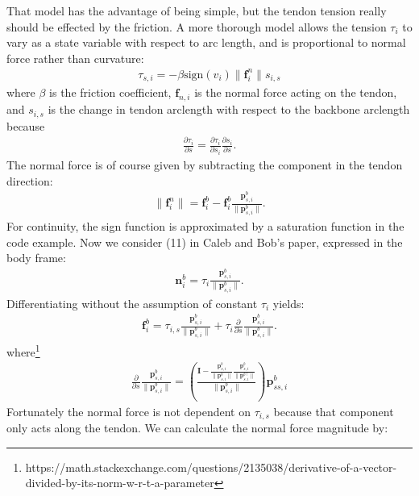 \documentclass[12pt]{article}
\begin{document}
That model has the advantage of being simple, but the tendon tension really should be effected by the friction. A more thorough model allows the tension $\tau_i$ to vary as a state variable with respect to arc length, and is proportional to normal force rather than curvature:
\begin{align*}
\tau_{s,i} = -\beta \text{sign}(v_{i}) \| \boldsymbol{f}^n_i \| s_{i,s}
\end{align*}
where $\beta$ is the friction coefficient, $\boldsymbol{f}_{n,i}$ is the normal force acting on the tendon, and $s_{i,s}$ is the change in tendon arclength with respect to the backbone arclength because
\begin{align*}
\frac{\partial \tau_i}{\partial s} = \frac{\partial \tau_i}{\partial s_i} \frac{\partial s_i}{ \partial s}.
\end{align*}
The normal force is of course given by subtracting the component in the tendon direction:
\begin{align*}
\| \boldsymbol{f}^n_i \| = \boldsymbol{f}^b_i - \boldsymbol{f}^b_i \frac{\boldsymbol{p}^b_{s,i}}{\| \boldsymbol{p}^b_{s,i} \|}.
\end{align*}
For continuity, the sign function is approximated by a saturation function in the code example. Now we consider (11) in Caleb and Bob's paper, expressed in the body frame:
\begin{align*}
\boldsymbol{n}^b_i = \tau_i \frac{\boldsymbol{p}^b_{s,i}}{\| \boldsymbol{p}^b_{s,i} \|}.
\end{align*}
Differentiating without the assumption of constant $\tau_i$ yields:
\begin{align*}
\boldsymbol{f}^b_i = \tau_{i,s} \frac{\boldsymbol{p}^b_{s,i}}{\| \boldsymbol{p}^b_{s,i} \|} + \tau_{i} \frac{\partial}{\partial s} \frac{\boldsymbol{p}^b_{s,i}}{\| \boldsymbol{p}^b_{s,i} \|}.
\end{align*}
where\footnote{https://math.stackexchange.com/questions/2135038/derivative-of-a-vector-divided-by-its-norm-w-r-t-a-parameter}
\begin{align*}
\frac{\partial}{\partial s} \frac{\boldsymbol{p}^b_{s,i}}{\| \boldsymbol{p}^b_{s,i} \|} = \left( \frac{\boldsymbol{I} - \frac{\boldsymbol{p}^b_{s,i}}{\| \boldsymbol{p}^b_{s,i} \|} \frac{\boldsymbol{p}^b_{s,i}}{\| \boldsymbol{p}^{b\top}_{s,i} \|}}{\| \boldsymbol{p}^b_{s,i} \|} \right) \boldsymbol{p}^b_{ss,i}
\end{align*}
Fortunately the normal force is not dependent on $\tau_{i,s}$ because that component only acts along the tendon. We can calculate the normal force magnitude by:
\end{document}

